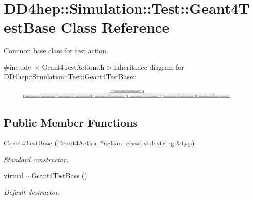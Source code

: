 \hypertarget{class_d_d4hep_1_1_simulation_1_1_test_1_1_geant4_test_base}{
\section{DD4hep::Simulation::Test::Geant4TestBase Class Reference}
\label{class_d_d4hep_1_1_simulation_1_1_test_1_1_geant4_test_base}
}


Common base class for test action.  


{\ttfamily \#include $<$Geant4TestActions.h$>$}Inheritance diagram for DD4hep::Simulation::Test::Geant4TestBase::\begin{figure}[H]
\begin{center}
\leavevmode
\includegraphics[height=0.583333cm]{class_d_d4hep_1_1_simulation_1_1_test_1_1_geant4_test_base}
\end{center}
\end{figure}
\subsection*{Public Member Functions}
\begin{DoxyCompactItemize}
\item 
\hyperlink{class_d_d4hep_1_1_simulation_1_1_test_1_1_geant4_test_base_aa66e1731de4829c114fd6fd8452a795b}{Geant4TestBase} (\hyperlink{class_d_d4hep_1_1_simulation_1_1_geant4_action}{Geant4Action} $\ast$action, const std::string \&typ)
\begin{DoxyCompactList}\small\item\em Standard constructor. \item\end{DoxyCompactList}\item 
virtual \hyperlink{class_d_d4hep_1_1_simulation_1_1_test_1_1_geant4_test_base_aa2aa8fa1fb375f02c3fa54116c90ef27}{$\sim$Geant4TestBase} ()
\begin{DoxyCompactList}\small\item\em Default destructor. \item\end{DoxyCompactList}\end{DoxyCompactItemize}
